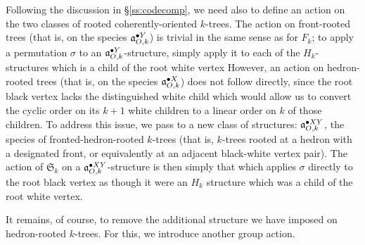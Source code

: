 \documentclass[sectionflow,singlespace,twoside,boldmathhdr]{brandiss} %
\numberwithin{section}{chapter}
\numberwithin{figure}{chapter}
\begin{document}
Following the discussion in \S \ref{ss:codecomp}, we need also to define an action on the two classes of rooted coherently-oriented $k$-trees.
The action on front-rooted trees (that is, on the species $\pointed[Y]{\mathfrak{a}}_{O, k}$) is trivial in the same sense as for $F_{k}$; to apply a permutation $\sigma$ to an $\pointed[Y]{\mathfrak{a}}_{O, k}$-structure, simply apply it to each of the $H_{k}$-structures which is a child of the root white vertex
However, an action on hedron-rooted trees (that is, on the species $\pointed[X]{\mathfrak{a}}_{O, k}$) does not follow directly, since the root black vertex lacks the distinguished white child which would allow us to convert the cyclic order on its $k+1$ white children to a linear order on $k$ of those children.
To address this issue, we pass to a new class of structures: $\pointed[XY]{\mathfrak{a}}_{O, k}$, the species of fronted-hedron-rooted $k$-trees (that is, $k$-trees rooted at a hedron with a designated front, or equivalently at an adjacent black-white vertex pair).
The action of $\mathfrak{S}_{k}$ on a $\pointed[XY]{\mathfrak{a}}_{O, k}$-structure is then simply that which applies $\sigma$ directly to the root black vertex as though it were an $H_{k}$ structure which was a child of the root white vertex.

It remains, of course, to remove the additional structure we have imposed on hedron-rooted $k$-trees.
For this, we introduce another group action.
\end{document}
